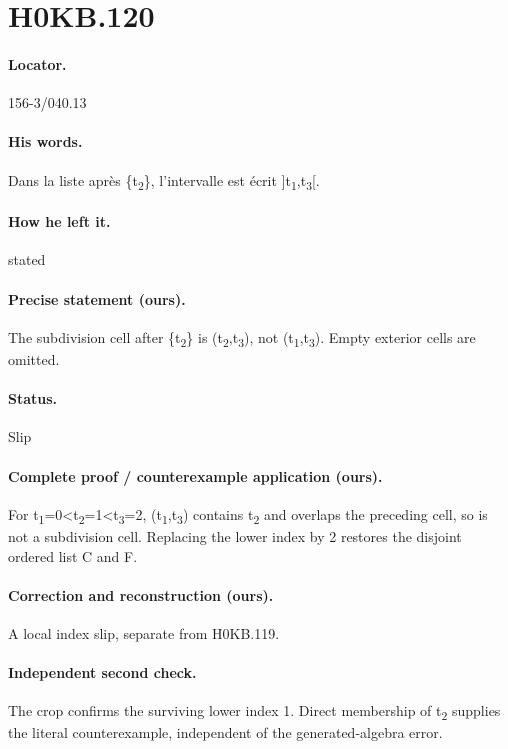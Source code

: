 \section*{H0KB.120}\label{statement:H0KB.120}
\paragraph{Locator.} 156-3/040.13

\paragraph{His words.} Dans la liste après \{t\textsubscript{2}\}, l’intervalle est écrit ]t\textsubscript{1},t\textsubscript{3}[.

\paragraph{How he left it.} stated

\paragraph{Precise statement (ours).} The subdivision cell after \{t\textsubscript{2}\} is (t\textsubscript{2},t\textsubscript{3}), not (t\textsubscript{1},t\textsubscript{3}). Empty exterior cells are omitted.

\paragraph{Status.} Slip

\paragraph{Complete proof / counterexample application (ours).} For t\textsubscript{1}=0<t\textsubscript{2}=1<t\textsubscript{3}=2, (t\textsubscript{1},t\textsubscript{3}) contains t\textsubscript{2} and overlaps the preceding cell, so is not a subdivision cell. Replacing the lower index by 2 restores the disjoint ordered list C and F.

\paragraph{Correction and reconstruction (ours).} A local index slip, separate from H0KB.119.

\paragraph{Independent second check.} The crop confirms the surviving lower index 1. Direct membership of t\textsubscript{2} supplies the literal counterexample, independent of the generated-algebra error.

